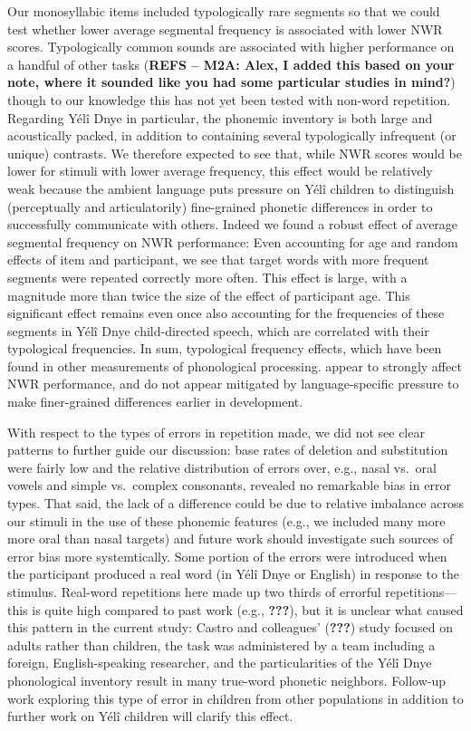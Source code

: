\documentclass[english,,man,floatsintext]{apa6}
\begin{document}
Our monosyllabic items included typologically rare segments so that we could test whether lower average segmental frequency is associated with lower NWR scores. Typologically common sounds are associated with higher performance on a handful of other tasks (\textbf{REFS -- M2A: Alex, I added this based on your note, where it sounded like you had some particular studies in mind?}) though to our knowledge this has not yet been tested with non-word repetition. Regarding Yélî Dnye in particular, the phonemic inventory is both large and acoustically packed, in addition to containing several typologically infrequent (or unique) contrasts. We therefore expected to see that, while NWR scores would be lower for stimuli with lower average frequency, this effect would be relatively weak because the ambient language puts pressure on Yélî children to distinguish (perceptually and articulatorily) fine-grained phonetic differences in order to successfully communicate with others. Indeed we found a robust effect of average segmental frequency on NWR performance: Even accounting for age and random effects of item and participant, we see that target words with more frequent segments were repeated correctly more often. This effect is large, with a magnitude more than twice the size of the effect of participant age. This significant effect remains even once also accounting for the frequencies of these segments in Yélî Dnye child-directed speech, which are correlated with their typological frequencies. In sum, typological frequency effects, which have been found in other measurements of phonological processing. appear to strongly affect NWR performance, and do not appear mitigated by language-specific pressure to make finer-grained differences earlier in development.

With respect to the types of errors in repetition made, we did not see clear patterns to further guide our discussion: base rates of deletion and substitution were fairly low and the relative distribution of errors over, e.g., nasal vs.~oral vowels and simple vs.~complex consonants, revealed no remarkable bias in error types. That said, the lack of a difference could be due to relative imbalance across our stimuli in the use of these phonemic features (e.g., we included many more more oral than nasal targets) and future work should investigate such sources of error bias more systemtically. Some portion of the errors were introduced when the participant produced a real word (in Yélî Dnye or English) in response to the stimulus. Real-word repetitions here made up two thirds of errorful repetitions---this is quite high compared to past work (e.g., {\textbf{???}}), but it is unclear what caused this pattern in the current study: Castro and colleagues' ({\textbf{???}}) study focused on adults rather than children, the task was administered by a team including a foreign, English-speaking researcher, and the particularities of the Yélî Dnye phonological inventory result in many true-word phonetic neighbors. Follow-up work exploring this type of error in children from other populations in addition to further work on Yélî children will clarify this effect.
\end{document}
